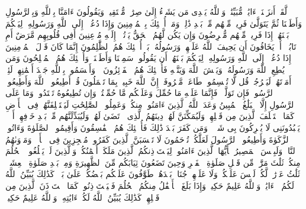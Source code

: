 \stopbuffer%
\startbuffer[\q:24:46]
لَّقَدۡ أَنزَلۡنَاۤ ءَایَٰتࣲ مُّبَیِّنَٰتࣲۚ وَٱللَّهُ یَهۡدِی مَن یَشَاۤءُ إِلَىٰ صِرَٰطࣲ مُّسۡتَقِیمࣲ%
\stopbuffer%
\startbuffer[\q:24:47]
وَیَقُولُونَ ءَامَنَّا بِٱللَّهِ وَبِٱلرَّسُولِ وَأَطَعۡنَا ثُمَّ یَتَوَلَّىٰ فَرِیقࣱ مِّنۡهُم مِّنۢ بَعۡدِ ذَٰلِكَۚ وَمَاۤ أُو۟لَٰۤئِكَ بِٱلۡمُؤۡمِنِینَ%
\stopbuffer%
\startbuffer[\q:24:48]
وَإِذَا دُعُوۤا۟ إِلَى ٱللَّهِ وَرَسُولِهِۦ لِیَحۡكُمَ بَیۡنَهُمۡ إِذَا فَرِیقࣱ مِّنۡهُم مُّعۡرِضُونَ%
\stopbuffer%
\startbuffer[\q:24:49]
وَإِن یَكُن لَّهُمُ ٱلۡحَقُّ یَأۡتُوۤا۟ إِلَیۡهِ مُذۡعِنِینَ%
\stopbuffer%
\startbuffer[\q:24:50]
أَفِی قُلُوبِهِم مَّرَضٌ أَمِ ٱرۡتَابُوۤا۟ أَمۡ یَخَافُونَ أَن یَحِیفَ ٱللَّهُ عَلَیۡهِمۡ وَرَسُولُهُۥۚ بَلۡ أُو۟لَٰۤئِكَ هُمُ ٱلظَّٰلِمُونَ%
\stopbuffer%
\startbuffer[\q:24:51]
إِنَّمَا كَانَ قَوۡلَ ٱلۡمُؤۡمِنِینَ إِذَا دُعُوۤا۟ إِلَى ٱللَّهِ وَرَسُولِهِۦ لِیَحۡكُمَ بَیۡنَهُمۡ أَن یَقُولُوا۟ سَمِعۡنَا وَأَطَعۡنَاۚ وَأُو۟لَٰۤئِكَ هُمُ ٱلۡمُفۡلِحُونَ%
\stopbuffer%
\startbuffer[\q:24:52]
وَمَن یُطِعِ ٱللَّهَ وَرَسُولَهُۥ وَیَخۡشَ ٱللَّهَ وَیَتَّقۡهِ فَأُو۟لَٰۤئِكَ هُمُ ٱلۡفَاۤئِزُونَ%
\stopbuffer%
\startbuffer[\q:24:53]
۞ وَأَقۡسَمُوا۟ بِٱللَّهِ جَهۡدَ أَیۡمَٰنِهِمۡ لَئِنۡ أَمَرۡتَهُمۡ لَیَخۡرُجُنَّۖ قُل لَّا تُقۡسِمُوا۟ۖ طَاعَةࣱ مَّعۡرُوفَةٌۚ إِنَّ ٱللَّهَ خَبِیرُۢ بِمَا تَعۡمَلُونَ%
\stopbuffer%
\startbuffer[\q:24:54]
قُلۡ أَطِیعُوا۟ ٱللَّهَ وَأَطِیعُوا۟ ٱلرَّسُولَۖ فَإِن تَوَلَّوۡا۟ فَإِنَّمَا عَلَیۡهِ مَا حُمِّلَ وَعَلَیۡكُم مَّا حُمِّلۡتُمۡۖ وَإِن تُطِیعُوهُ تَهۡتَدُوا۟ۚ وَمَا عَلَى ٱلرَّسُولِ إِلَّا ٱلۡبَلَٰغُ ٱلۡمُبِینُ%
\stopbuffer%
\startbuffer[\q:24:55]
وَعَدَ ٱللَّهُ ٱلَّذِینَ ءَامَنُوا۟ مِنكُمۡ وَعَمِلُوا۟ ٱلصَّٰلِحَٰتِ لَیَسۡتَخۡلِفَنَّهُمۡ فِی ٱلۡأَرۡضِ كَمَا ٱسۡتَخۡلَفَ ٱلَّذِینَ مِن قَبۡلِهِمۡ وَلَیُمَكِّنَنَّ لَهُمۡ دِینَهُمُ ٱلَّذِی ٱرۡتَضَىٰ لَهُمۡ وَلَیُبَدِّلَنَّهُم مِّنۢ بَعۡدِ خَوۡفِهِمۡ أَمۡنࣰاۚ یَعۡبُدُونَنِی لَا یُشۡرِكُونَ بِی شَیۡءࣰاۚ وَمَن كَفَرَ بَعۡدَ ذَٰلِكَ فَأُو۟لَٰۤئِكَ هُمُ ٱلۡفَٰسِقُونَ%
\stopbuffer%
\startbuffer[\q:24:56]
وَأَقِیمُوا۟ ٱلصَّلَوٰةَ وَءَاتُوا۟ ٱلزَّكَوٰةَ وَأَطِیعُوا۟ ٱلرَّسُولَ لَعَلَّكُمۡ تُرۡحَمُونَ%
\stopbuffer%
\startbuffer[\q:24:57]
لَا تَحۡسَبَنَّ ٱلَّذِینَ كَفَرُوا۟ مُعۡجِزِینَ فِی ٱلۡأَرۡضِۚ وَمَأۡوَىٰهُمُ ٱلنَّارُۖ وَلَبِئۡسَ ٱلۡمَصِیرُ%
\stopbuffer%
\startbuffer[\q:24:58]
یَٰۤأَیُّهَا ٱلَّذِینَ ءَامَنُوا۟ لِیَسۡتَءۡذِنكُمُ ٱلَّذِینَ مَلَكَتۡ أَیۡمَٰنُكُمۡ وَٱلَّذِینَ لَمۡ یَبۡلُغُوا۟ ٱلۡحُلُمَ مِنكُمۡ ثَلَٰثَ مَرَّٰتࣲۚ مِّن قَبۡلِ صَلَوٰةِ ٱلۡفَجۡرِ وَحِینَ تَضَعُونَ ثِیَابَكُم مِّنَ ٱلظَّهِیرَةِ وَمِنۢ بَعۡدِ صَلَوٰةِ ٱلۡعِشَاۤءِۚ ثَلَٰثُ عَوۡرَٰتࣲ لَّكُمۡۚ لَیۡسَ عَلَیۡكُمۡ وَلَا عَلَیۡهِمۡ جُنَاحُۢ بَعۡدَهُنَّۚ طَوَّٰفُونَ عَلَیۡكُم بَعۡضُكُمۡ عَلَىٰ بَعۡضࣲۚ كَذَٰلِكَ یُبَیِّنُ ٱللَّهُ لَكُمُ ٱلۡءَایَٰتِۗ وَٱللَّهُ عَلِیمٌ حَكِیمࣱ%
\stopbuffer%
\startbuffer[\q:24:59]
وَإِذَا بَلَغَ ٱلۡأَطۡفَٰلُ مِنكُمُ ٱلۡحُلُمَ فَلۡیَسۡتَءۡذِنُوا۟ كَمَا ٱسۡتَءۡذَنَ ٱلَّذِینَ مِن قَبۡلِهِمۡۚ كَذَٰلِكَ یُبَیِّنُ ٱللَّهُ لَكُمۡ ءَایَٰتِهِۦۗ وَٱللَّهُ عَلِیمٌ حَكِیمࣱ%
\stopbuffer%
